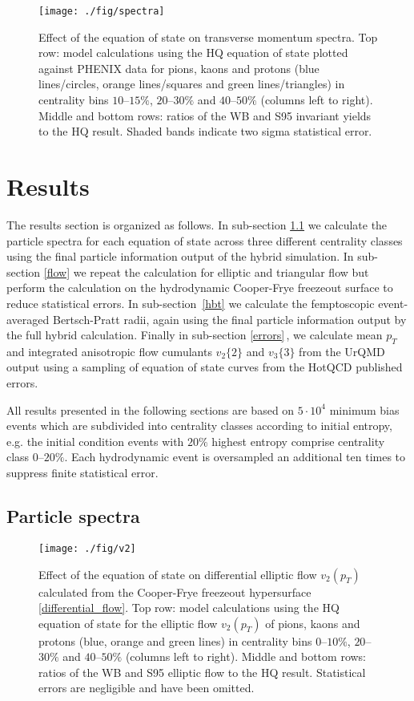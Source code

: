 \documentclass[aps,prc,reprint,amsmath,nofootinbib,superscriptaddress]{revtex4-1}
\begin{document}
\begin{figure*}[t]
  \texttt{[image: ./fig/spectra]}
  \caption{
    \label{fig:spectra} Effect of the equation of state on transverse momentum spectra. Top row: model calculations using the HQ equation of state plotted against 
    PHENIX data for pions, kaons and protons (blue lines/circles, orange lines/squares and green lines/triangles) in centrality bins $10$--$15\%$, $20$--$30\%$ and $40$--$50\%$ 
    (columns left to right). Middle and bottom rows: ratios of the WB and S95 invariant yields to the HQ result. Shaded bands indicate two sigma statistical error. }
\end{figure*}

\section{Results}
\label{results}

The results section is organized as follows. In sub-section \ref{spectra} we calculate the particle spectra for each equation of state across three different centrality classes using the final 
particle information output of the hybrid simulation. In sub-section \ref{flow} we repeat the calculation for elliptic and triangular flow but perform the calculation on the 
hydrodynamic Cooper-Frye freezeout surface to reduce statistical errors. In sub-section~\ref{hbt} we calculate the femptoscopic event-averaged Bertsch-Pratt radii, again using the 
final particle information output by the full hybrid calculation. Finally in sub-section \ref{errors}\,, we calculate mean $p_T$ and integrated anisotropic flow cumulants $v_2\{2\}$ and $v_3\{3\}$ from the UrQMD output using a sampling of equation of state curves from the HotQCD published errors. 

All results presented in the following sections are based on $5\cdot10^4$ minimum bias events which are subdivided into centrality classes according to initial entropy, e.g. the initial condition events with $20\%$ highest entropy comprise centrality class $0$--$20\%$. Each hydrodynamic event is oversampled an additional ten times to suppress finite statistical error.

\subsection{Particle spectra}
\label{spectra}

\begin{figure*}[t]
  \texttt{[image: ./fig/v2]}
  \caption{
    \label{fig:v2} Effect of the equation of state on differential elliptic flow $v_2(p_T)$ calculated from the Cooper-Frye freezeout hypersurface \eqref{differential_flow}.
    Top row: model calculations using the HQ equation of state for the elliptic flow $v_2(p_T)$ of pions, kaons and protons (blue, orange and green lines) 
    in centrality bins $0$--$10\%$, $20$--$30\%$ and $40$--$50\%$ (columns left to right). Middle and bottom rows: ratios of the WB and S95 elliptic flow to 
    the HQ result. Statistical errors are negligible and have been omitted.
  }
\end{figure*}
\end{document}
